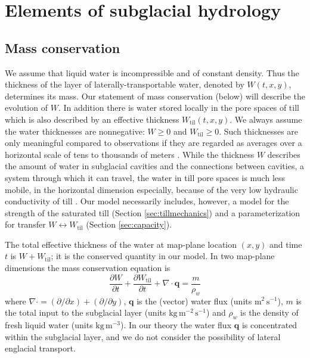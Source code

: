 \documentclass[11pt,final]{amsart}
\newcommand\bq{\mathbf{q}}
\newcommand{\Div}{\nabla\cdot}
\newcommand{\Wtil}{W_{\text{til}}}
\begin{document}
\section{Elements of subglacial hydrology} \label{sec:elements}

\subsection*{Mass conservation}  We assume that liquid water is incompressible and of constant density.  Thus the thickness of the layer of laterally-transportable water, denoted by $W(t,x,y)$, determines its mass.  Our statement of mass conservation (below) will describe the evolution of $W$.  In addition there is water stored locally in the pore spaces of till \citep{Tulaczyketal2000b} which is also described by an effective thickness $\Wtil(t,x,y)$.  We always assume the water thicknesses are nonnegative: $W \ge 0$ and $\Wtil \ge 0$.  Such thicknesses are only meaningful compared to observations if they are regarded as averages over a horizontal scale of tens to thousands of meters \citep{FlowersClarke2002_theory}.  While the thickness $W$ describes the amount of water in subglacial cavities and the connections between cavities, a system through which it can travel, the water in till pore spaces is much less mobile, in the horizontal dimension especially, because of the very low hydraulic conductivity of till \citep{TrufferEchelmeyerHarrison2001,Tulaczyketal2000}.  Our model necessarily includes, however, a model for the strength of the saturated till (Section \ref{sec:tillmechanics}) and a parameterization for transfer $W \leftrightarrow \Wtil$ (Section \ref{sec:capacity}).

The total effective thickness of the water at map-plane location $(x,y)$ and time $t$ is $W + \Wtil$; it is the conserved quantity in our model.  In two map-plane dimensions the mass conservation equation is \citep[compare][]{Clarke05}
\begin{equation} \label{eq:conserve}
\frac{\partial W}{\partial t} + \frac{\partial \Wtil}{\partial t} + \Div \bq = \frac{m}{\rho_w}
\end{equation}
where $\Div = (\partial/\partial x) + (\partial/\partial y)$, $\bq$ is the (vector) water flux (units $\text{m}^2\,\text{s}^{-1}$), $m$ is the total input to the subglacial layer (units $\text{kg}\,\text{m}^{-2}\,\text{s}^{-1}$) and $\rho_w$ is the density of fresh liquid water (units $\text{kg}\,\text{m}^{-3}$).  In our theory the water flux $\bq$ is concentrated within the subglacial layer, and we do not consider the possibility of lateral englacial transport.
\end{document}
